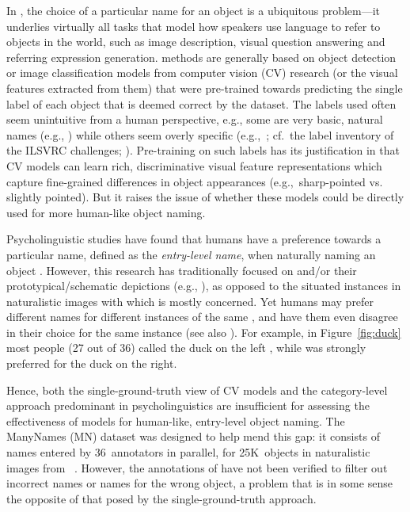 In \lv, the choice of a particular name for an object is a ubiquitous problem---it underlies virtually all tasks that model how speakers use language to refer to objects in the world, such as image description, visual question answering and referring expression generation.
\lv methods are generally based on object detection or image classification models from computer vision (CV) research (or the visual features extracted from them) that were pre-trained towards predicting the single label of each object that is deemed correct by the dataset.
The labels used often seem unintuitive from a human perspective, e.g., some are very basic, natural names (e.g., ) while others seem overly specific (e.g.,\ ; cf.\ the label inventory of the ILSVRC challenges; \citealt{ILSVRC15}).
Pre-training on such labels has its justification in that CV models can learn rich, discriminative visual feature representations which capture fine-grained differences in object appearances (e.g.,\ sharp-pointed vs. slightly pointed). 
But it raises the issue of whether these models could be directly used for more human-like object naming.

Psycholinguistic studies have found that humans have a preference towards a particular name, defined as the \textit{entry-level name}, when naturally naming an object \cite{rosch1976basic,Rosch1978,jolicoeur1984pictures}. 
However, this research has traditionally focused on \categories and/or their prototypical/schematic depictions (e.g., ), as opposed to the situated instances in naturalistic images with which \lv is mostly concerned.
Yet humans may prefer different names for different instances of the same \category, and have them even disagree in their choice for the same instance (see also \citealt{graf2016animal}).
For example, in Figure~\ref{fig:duck} most people (27 out of 36) called the duck on the left , while  was strongly preferred for the duck on the right. 

Hence, both the single-ground-truth view of CV models and the category-level approach predominant in psycholinguistics are insufficient for assessing the effectiveness of \lv models for human-like, entry-level object naming.
The ManyNames (MN) dataset was designed to help mend this gap: it consists of names entered by 36~annotators in parallel, for 25K~objects in naturalistic images from \vg~\cite{krishna2016visualgenome}.
However, the annotations of \mn have not been verified to filter out incorrect names or names for the wrong object, a problem that is in some sense the opposite of that posed by the single-ground-truth approach.

